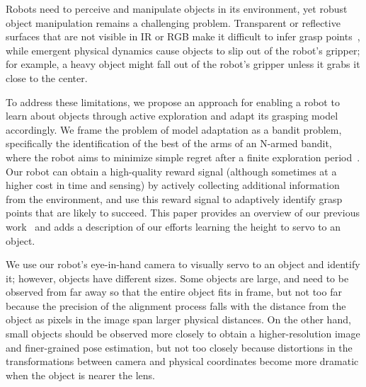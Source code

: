 \documentclass[conference,onecolumn]{IEEEtran}
\begin{document}




%
\IEEEpeerreviewmaketitle


Robots need to perceive and manipulate objects in its environment, yet
robust object manipulation remains a challenging problem.  Transparent
or reflective surfaces that are not visible in IR or RGB make it
difficult to infer grasp points~\citep{lysenkov13}, while emergent
physical dynamics cause objects to slip out of the robot's gripper;
for example, a heavy object might fall out of the robot's gripper
unless it grabs it close to the center.

To address these limitations, we propose an approach for enabling a
robot to learn about objects through active exploration and adapt its
grasping model accordingly.  We frame the problem of model adaptation
as a bandit problem, specifically the identification of the best of
the arms of an N-armed bandit, ~\citep{thompson33} where the robot
aims to minimize simple regret after a finite exploration
period~\citep{bubeck09}.  Our robot can obtain a high-quality reward
signal (although sometimes at a higher cost in time and sensing) by
actively collecting additional information from the environment, and
use this reward signal to adaptively identify grasp points that are
likely to succeed.  This paper provides an overview of our previous
work~\citep{oberlin15} and adds a description of our efforts learning
the height to servo to an object.

We use our robot's eye-in-hand camera to visually servo to an object
and identify it; however, objects have different sizes. Some objects
are large, and need to be observed from far away so that the entire
object fits in frame, but not too far because the precision of the
alignment process falls with
the distance from the object as pixels in the image span larger physical
distances.  On the other hand, small objects should be
observed more closely to obtain a higher-resolution image and
finer-grained pose estimation, but not too closely because distortions
in the transformations between camera and physical coordinates become more
dramatic when the object is nearer the lens.  
\end{document}
